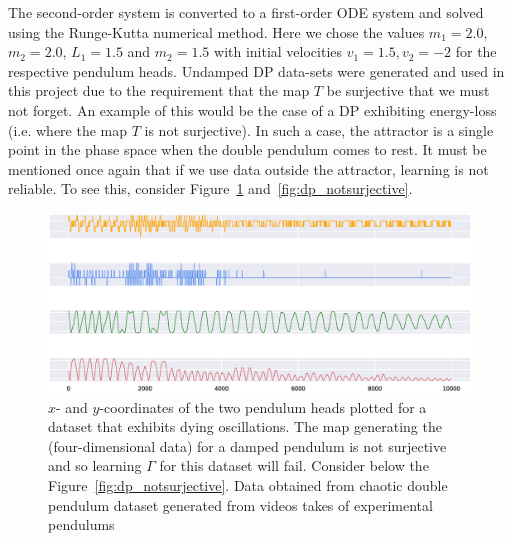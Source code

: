 The second-order system is converted to a first-order ODE system and solved using the Runge-Kutta numerical method.  
Here we chose the values $m_1=2.0$, $m_2=2.0$, $L_1=1.5$ and $m_2=1.5$ with initial velocities $v_1=1.5, v_2=-2$ for the respective pendulum heads.
Undamped DP data-sets were generated and used in this project due to the requirement that the map $T$ be surjective that we must not forget. 
An example of this would be the case of a DP exhibiting energy-loss (i.e. where the map $T$ is not surjective). In such a case, the attractor is a single point in the phase space when the double pendulum comes to rest. 
It must be mentioned once again that if we use data outside the attractor, learning is not reliable. 
To see this, consider Figure~\ref{fig:damped_pendulum} and~\ref{fig:dp_notsurjective}.

\begin{figure}[ht]
  \includegraphics[scale=0.4]{Graphs/_dp_dying.eps}
  \centering
\caption{$x$- and $y$-coordinates of the two pendulum heads plotted for a dataset that exhibits dying oscillations. The map generating the (four-dimensional data) for a damped pendulum is not surjective and so learning $\Gamma$ for this dataset will fail. Consider below the Figure~\ref{fig:dp_notsurjective}. Data obtained from chaotic double pendulum dataset generated from videos takes of experimental pendulums~\cite{asseman2018learning}}
\label{fig:damped_pendulum}
\end{figure}



